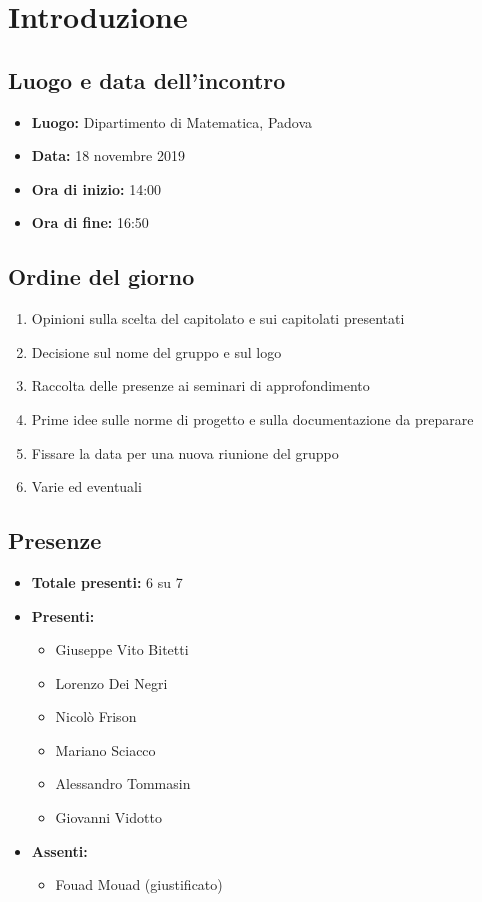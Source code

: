 \section*{Introduzione}

\subsection*{Luogo e data dell'incontro}
	\begin{itemize}
		\item \textbf{Luogo:} Dipartimento di Matematica, Padova
		\item \textbf{Data:} 18 novembre 2019
		\item \textbf{Ora di inizio:} 14:00
		\item \textbf{Ora di fine:} 16:50
	\end{itemize}

\subsection*{Ordine del giorno}
	\begin{enumerate}
		\item Opinioni sulla scelta del capitolato e sui capitolati presentati
		\item Decisione sul nome del gruppo e sul logo
		\item Raccolta delle presenze ai seminari di approfondimento
		\item Prime idee sulle norme di progetto e sulla documentazione da preparare
		\item Fissare la data per una nuova riunione del gruppo
		\item Varie ed eventuali
	\end{enumerate}

\subsection*{Presenze}
	\begin{itemize}
		\item \textbf{Totale presenti:} 6 su 7
		\item \textbf{Presenti: }
			\begin{itemize}			
				\item Giuseppe Vito Bitetti
				\item Lorenzo Dei Negri
				\item Nicolò Frison
				\item Mariano Sciacco
				\item Alessandro Tommasin
				\item Giovanni Vidotto
			\end{itemize}
		\item \textbf{Assenti: } 
			\begin{itemize}	
				\item Fouad Mouad (giustificato)
			\end{itemize}
	\end{itemize}


